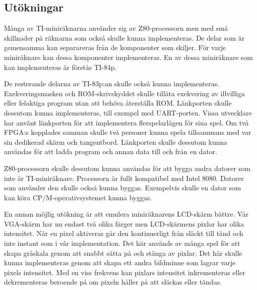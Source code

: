 \documentclass[main.tex]{subfiles}
\begin{document}
\subsection{Utökningar}
Många av TI-miniräknarna använder sig av Z80-processorn men med små skillnader
på räknarna som också skulle kunna implementeras. De delar som är gemensamma
kan separareras från de komponenter som skiljer. För varje miniräknare kan
dessa komponenter implementeras. En av dessa miniräknare som kan implementeras
är förstås TI-84p.

De resterande delarna av TI-83p:an skulle också kunna implementeras.
Exekveringsmasken och ROM-skrivskyddet skulle tillåta exekvering av illvilliga
eller felaktiga program utan att behöva återställa ROM. Länkporten skulle
dessutom kunna implementeras, till exempel med UART-porten. Vissa utvecklare
har använt länkporten för att implementera flerspelarlägen för sina spel. Om
två FPGA:s kopplades samman skulle två personer kunna spela tillsammans med var
sin dedikerad skärm och tangentbord. Länkporten skulle dessutom kunna användas
för att ladda program och annan data till och från en dator.

Z80-processorn skulle dessutom kunna användas för att bygga andra datorer som
inte är TI-miniräknare. Processorn är fullt kompatibel med Intel 8080. Datorer
som använder den skulle också kunna byggas. Exempelvis skulle en dator som kan
köra CP/M-operativsystemet kunna byggas.

En annan möjlig utökning är att emulera miniräknarens LCD-skärm bättre. Vår
VGA-skärm har nu endast två olika färger men LCD-skärmens pixlar har olika
intensitet. När en pixel aktiveras går den kontinuerligt från släckt till tänd
och inte instant som i vår implementation. Det här används av många spel för
att skapa gråskala genom att snabbt sätta på och stänga av pixlar. Det här
skulle kunna implementeras genom att skapa ett andra bildminne som lagrar varje
pixels intensitet. Med en viss frekvens kan pixlars intensitet inkrementeras
eller dekrementeras beroende på om pixeln håller på att släckas eller tändas.
\end{document}

